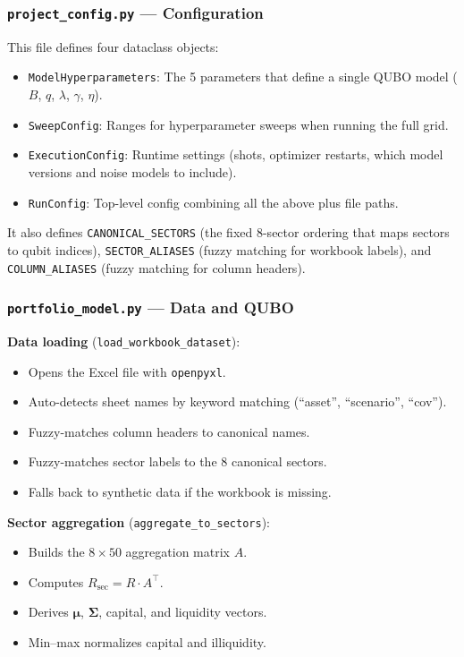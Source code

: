 \documentclass[12pt, a4paper]{article}
\begin{document}
\subsubsection{\texttt{project\_config.py} --- Configuration}

This file defines four dataclass objects:

\begin{itemize}
    \item \texttt{ModelHyperparameters}: The 5 parameters that define a single QUBO model ($B$, $q$, $\lambda$, $\gamma$, $\eta$).
    \item \texttt{SweepConfig}: Ranges for hyperparameter sweeps when running the full grid.
    \item \texttt{ExecutionConfig}: Runtime settings (shots, optimizer restarts, which model versions and noise models to include).
    \item \texttt{RunConfig}: Top-level config combining all the above plus file paths.
\end{itemize}

It also defines \texttt{CANONICAL\_SECTORS} (the fixed 8-sector ordering that maps sectors to qubit indices), \texttt{SECTOR\_ALIASES} (fuzzy matching for workbook labels), and \texttt{COLUMN\_ALIASES} (fuzzy matching for column headers).

\subsubsection{\texttt{portfolio\_model.py} --- Data and QUBO}

\textbf{Data loading} (\texttt{load\_workbook\_dataset}):
\begin{itemize}
    \item Opens the Excel file with \texttt{openpyxl}.
    \item Auto-detects sheet names by keyword matching (``asset'', ``scenario'', ``cov'').
    \item Fuzzy-matches column headers to canonical names.
    \item Fuzzy-matches sector labels to the 8 canonical sectors.
    \item Falls back to synthetic data if the workbook is missing.
\end{itemize}

\textbf{Sector aggregation} (\texttt{aggregate\_to\_sectors}):
\begin{itemize}
    \item Builds the $8 \times 50$ aggregation matrix $A$.
    \item Computes $R_{\text{sec}} = R \cdot A^\top$.
    \item Derives $\bm{\mu}$, $\bm{\Sigma}$, capital, and liquidity vectors.
    \item Min--max normalizes capital and illiquidity.
\end{itemize}
\end{document}
